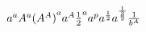 $ a^a A^a {(A^A)}^a a^A {\frac{1}{2}}^a a^p a^{\frac{1}{2}} a^{\frac{1}{\frac{3}{2}}} {1 \over {b^A}} $
